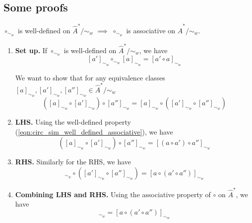 \subsection{Some proofs}

\begin{propositionE}\label{prp:circ_local_well_defined_implies_circ_local_associative}
    $\circ_{\sim_{w}}$ is well-defined on $\hat{A}^{*}/\sim_{w}$ $\implies$ $\circ_{\sim_{w}}$ is associative on $\hat{A}^{*}/\sim_{w}$.
\end{propositionE}
\begin{proofE}
\begin{enumerate}
    \item \textbf{Set up.}
    If $\circ_{\sim_{w}}$ is well-defined on $\hat{A}^{*}/\sim_{w}$, we have
    \begin{equation}\label{eqn:circ_sim_well_defined_associative}
        [a']_{\sim_{w}} \circ_{\sim_{w}} [a]_{\sim_{w}} = [a' \circ a]_{\sim_{w}}
    \end{equation}

    We want to show that for any equivalence classes $[a]_{\sim_{w}}, [a']_{\sim_{w}}, [a'']_{\sim_{w}} \in \hat{A}^{*}/\sim_{w}$
    \begin{equation}
        ([a]_{\sim_{w}} \circ [a']_{\sim_{w}}) \circ [a'']_{\sim_{w}} = [a]_{\sim_{w}} \circ ([a']_{\sim_{w}} \circ [a'']_{\sim_{w}})
    \end{equation}

    \item \textbf{LHS.}
    Using the well-defined property (\cref{eqn:circ_sim_well_defined_associative}), we have
    \begin{equation}
        ([a]_{\sim_{w}} \circ [a']_{\sim_{w}}) \circ [a'']_{\sim_{w}} = [(a \circ a') \circ a'']_{\sim_{w}}
    \end{equation}

    \item \textbf{RHS.}
    Similarly for the RHS, we have
    \begin{equation}
        [a]_{\sim_{w}} \circ ([a']_{\sim_{w}} \circ [a'']_{\sim_{w}}) = [a \circ (a' \circ a'')]_{\sim_{w}}
    \end{equation}
    \item \textbf{Combining LHS and RHS.}
    Using the associative property of $\circ$ on $\hat{A}^{*}$, we have
    \begin{equation}
        [(a \circ a') \circ a'']_{\sim_{w}} = [a \circ (a' \circ a'')]_{\sim_{w}}
    \end{equation}
\end{enumerate}
\end{proofE}

